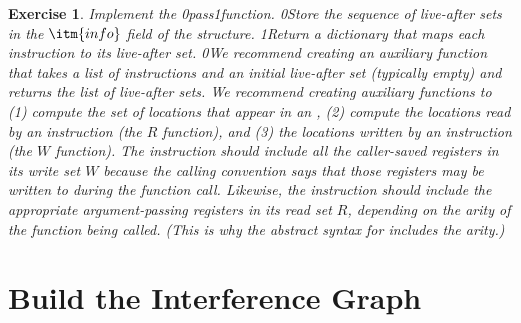 \documentclass[7x10]{TimesAPriori_MIT}%
\def\racketEd{0}
\def\pythonEd{1}
\def\edition{1}
\newcommand{\racket}[1]{{\if\edition\racketEd{#1}\fi}}
\newcommand{\pythonColor}[0]{}
\newcommand{\python}[1]{{\if\edition\pythonEd\pythonColor #1\fi}}
\newtheorem{exercise}[theorem]{Exercise}
\numberwithin{theorem}{chapter}
\numberwithin{definition}{chapter}
\numberwithin{equation}{chapter}
\begin{document}
\begin{exercise}\normalfont\normalsize
  Implement the  \racket{pass}\python{function}.
\racket{Store the sequence of live-after sets in the $\itm{info}$
  field of the \code{Block} structure.}
%
\python{Return a dictionary that maps each instruction to its
  live-after set.}
%
\racket{We recommend creating an auxiliary function that takes a list
  of instructions and an initial live-after set (typically empty) and
  returns the list of live-after sets.}
%
We recommend creating auxiliary functions to (1) compute the set
of locations that appear in an \Arg{}, (2) compute the locations read
by an instruction (the $R$ function), and (3) the locations written by
an instruction (the $W$ function). The  instruction should
include all the caller-saved registers in its write set $W$ because
the calling convention says that those registers may be written to
during the function call. Likewise, the  instruction
should include the appropriate argument-passing registers in its
read set $R$, depending on the arity of the function being
called. (This is why the abstract syntax for  includes the
arity.)
\end{exercise}


\section{Build the Interference Graph}
\label{sec:build-interference}
\end{document}
